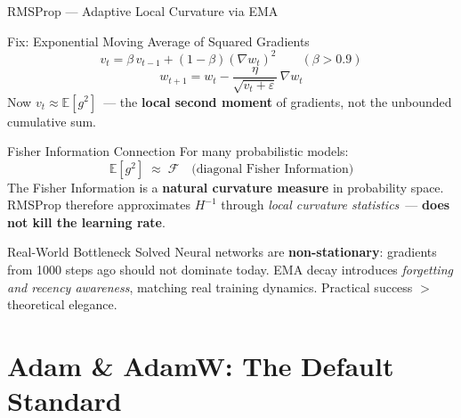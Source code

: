 \documentclass{beamer}
\begin{document}
\begin{frame}[shrink=10]{RMSProp --- Adaptive Local Curvature via EMA}
  \begin{block}{Fix: Exponential Moving Average of Squared Gradients}
    \[
      v_t = \beta\,v_{t-1} + (1-\beta)(\nabla w_t)^2
      \qquad (\beta > 0.9)
    \]
    \[
      \boxed{w_{t+1} = w_t
        - \frac{\eta}{\sqrt{v_t+\varepsilon}}\,\nabla w_t}
    \]
    Now $v_t \approx \mathbb{E}[g^2]$~--- the \textbf{local second
    moment} of gradients, not the unbounded cumulative sum.
  \end{block}

  \medskip

  \begin{block}{Fisher Information Connection}
    For many probabilistic models:
    \[
      \mathbb{E}[g^2] \;\approx\; \mathcal{F}
      \quad\text{(diagonal Fisher Information)}
    \]
    The Fisher Information is a \textbf{natural curvature measure} in
    probability space.
    RMSProp therefore approximates $H^{-1}$ through
    \emph{local curvature statistics}~---
    \textbf{does not kill the learning rate}.
  \end{block}

  \begin{exampleblock}{Real-World Bottleneck Solved}
    Neural networks are \textbf{non-stationary}: gradients from 1000
    steps ago should not dominate today.
    EMA decay introduces \emph{forgetting and recency awareness},
    matching real training dynamics.
    Practical success $>$ theoretical elegance.
  \end{exampleblock}
\end{frame}

\section{Adam \& AdamW: The Default Standard}
\end{document}
